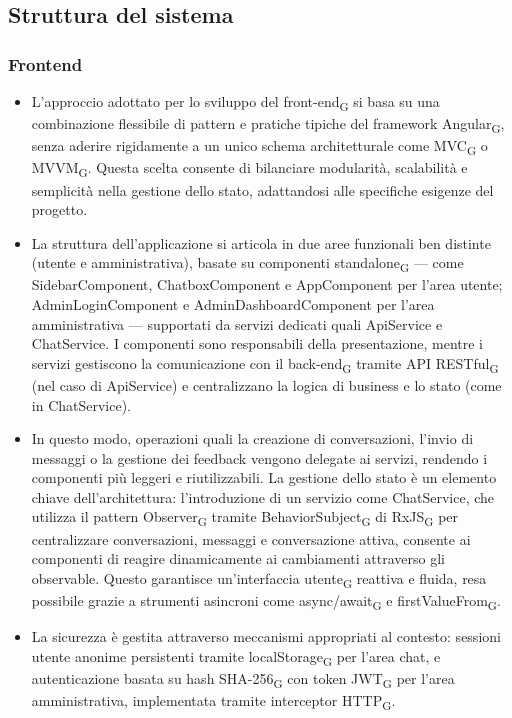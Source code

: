 \subsection{Struttura del sistema}
\subsubsection{Frontend}
\begin{itemize}
\item L'approccio adottato per lo sviluppo del front-end\textsubscript{G} si basa su una combinazione flessibile di pattern e pratiche tipiche del framework Angular\textsubscript{G}, senza aderire rigidamente a un unico schema architetturale come MVC\textsubscript{G} o MVVM\textsubscript{G}. Questa scelta consente di bilanciare modularità, scalabilità e semplicità nella gestione dello stato, adattandosi alle specifiche esigenze del progetto. 
\item La struttura dell'applicazione si articola in due aree funzionali ben distinte (utente e amministrativa), basate su componenti standalone\textsubscript{G} — come SidebarComponent, ChatboxComponent e AppComponent per l'area utente; AdminLoginComponent e AdminDashboardComponent per l'area amministrativa — supportati da servizi dedicati quali ApiService e ChatService. I componenti sono responsabili della presentazione, mentre i servizi gestiscono la comunicazione con il back-end\textsubscript{G} tramite API RESTful\textsubscript{G} (nel caso di ApiService) e centralizzano la logica di business e lo stato (come in ChatService). 
\item In questo modo, operazioni quali la creazione di conversazioni, l'invio di messaggi o la gestione dei feedback vengono delegate ai servizi, rendendo i componenti più leggeri e riutilizzabili. La gestione dello stato è un elemento chiave dell'architettura: l'introduzione di un servizio come ChatService, che utilizza il pattern Observer\textsubscript{G} tramite BehaviorSubject\textsubscript{G} di RxJS\textsubscript{G} per centralizzare conversazioni, messaggi e conversazione attiva, consente ai componenti di reagire dinamicamente ai cambiamenti attraverso gli observable. Questo garantisce un'interfaccia utente\textsubscript{G} reattiva e fluida, resa possibile grazie a strumenti asincroni come async/await\textsubscript{G} e firstValueFrom\textsubscript{G}.
\item La sicurezza è gestita attraverso meccanismi appropriati al contesto: sessioni utente anonime persistenti tramite localStorage\textsubscript{G} per l'area chat, e autenticazione basata su hash SHA-256\textsubscript{G} con token JWT\textsubscript{G} per l'area amministrativa, implementata tramite interceptor HTTP\textsubscript{G}.
\end{itemize}
